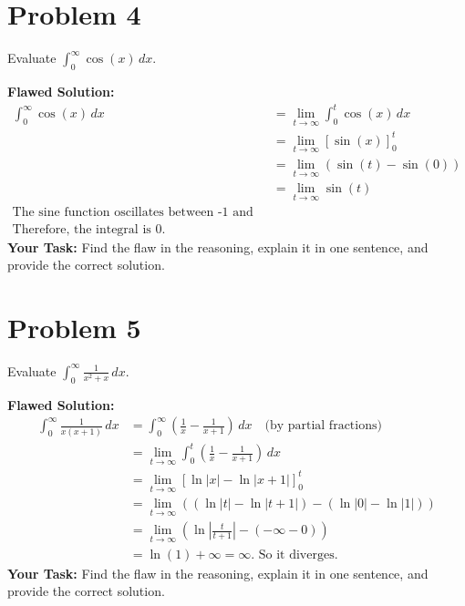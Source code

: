 \documentclass{article}
\begin{document}
\section{Problem 4}
Evaluate $\displaystyle \int_{0}^{\infty} \cos(x) \,dx$.

\textbf{Flawed Solution:}
\begin{align*}
    \int_{0}^{\infty} \cos(x) \,dx &= \lim_{t \to \infty} \int_{0}^{t} \cos(x) \,dx \\
    &= \lim_{t \to \infty} [\sin(x)]_{0}^{t} \\
    &= \lim_{t \to \infty} (\sin(t) - \sin(0)) \\
    &= \lim_{t \to \infty} \sin(t) \\
    \text{The sine function oscillates between -1 and 1, so the average value is 0.} \\
    \text{Therefore, the integral is 0.}
\end{align*}
\textbf{Your Task:} Find the flaw in the reasoning, explain it in one sentence, and provide the correct solution.

\section{Problem 5}
Evaluate $\displaystyle \int_{0}^{\infty} \frac{1}{x^2 + x} \,dx$.

\textbf{Flawed Solution:}
\begin{align*}
    \int_{0}^{\infty} \frac{1}{x(x+1)} \,dx &= \int_{0}^{\infty} \left( \frac{1}{x} - \frac{1}{x+1} \right) \,dx \quad \text{(by partial fractions)} \\
    &= \lim_{t \to \infty} \int_{0}^{t} \left( \frac{1}{x} - \frac{1}{x+1} \right) \,dx \\
    &= \lim_{t \to \infty} [\ln|x| - \ln|x+1|]_{0}^{t} \\
    &= \lim_{t \to \infty} \left( (\ln|t| - \ln|t+1|) - (\ln|0| - \ln|1|) \right) \\
    &= \lim_{t \to \infty} \left( \ln\left|\frac{t}{t+1}\right| - (-\infty - 0) \right) \\
    &= \ln(1) + \infty = \infty. \text{ So it diverges.}
\end{align*}
\textbf{Your Task:} Find the flaw in the reasoning, explain it in one sentence, and provide the correct solution.
\end{document}

